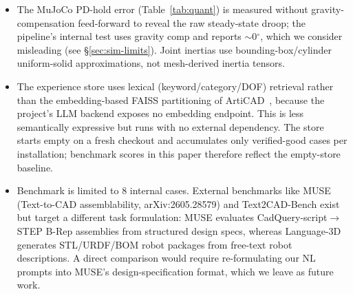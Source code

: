 \documentclass[conference]{IEEEtran}
\begin{document}
\begin{itemize}
    \item The MuJoCo PD-hold error (Table~\ref{tab:quant}) is measured without gravity-compensation feed-forward to reveal the raw steady-state droop; the pipeline's internal test uses gravity comp and reports $\sim$0$^\circ$, which we consider misleading (see \S\ref{sec:sim-limits}). Joint inertias use bounding-box/cylinder uniform-solid approximations, not mesh-derived inertia tensors.
    \item The experience store uses lexical (keyword/category/DOF) retrieval rather than the embedding-based FAISS partitioning of ArtiCAD~\cite{articad2026}, because the project's LLM backend exposes no embedding endpoint. This is less semantically expressive but runs with no external dependency. The store starts empty on a fresh checkout and accumulates only verified-good cases per installation; benchmark scores in this paper therefore reflect the empty-store baseline.
    \item Benchmark is limited to 8 internal cases. External benchmarks like MUSE~\cite{muse2026} (Text-to-CAD assemblability, arXiv:2605.28579) and Text2CAD-Bench exist but target a different task formulation: MUSE evaluates CadQuery-script$\to$STEP B-Rep assemblies from structured design specs, whereas Language-3D generates STL/URDF/BOM robot packages from free-text robot descriptions. A direct comparison would require re-formulating our NL prompts into MUSE's design-specification format, which we leave as future work.
\end{itemize}
\end{document}
